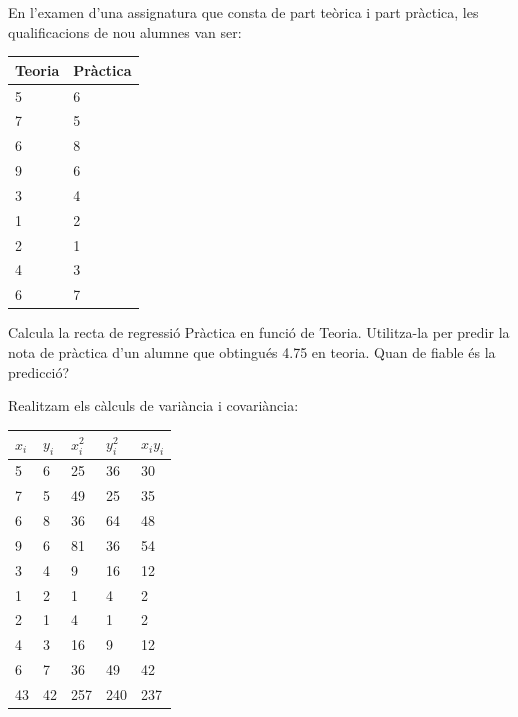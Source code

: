 \begin{resolt}[E]{
En l'examen d'una assignatura que consta de part teòrica i part pràctica, les qualificacions de nou alumnes van ser:
\vspace{0.25cm}

\begin{tabular}{|p{0.7in}|p{0.7in}|}
	 \hline
	\textbf{Teoria} & \textbf{Pràctica} \\ \hline
	5 & 6\\ \hline
	7 & 5 \\ \hline
	6 & 8 \\ \hline
	9 & 6\\ \hline
	3 & 4\\ \hline
	1 & 2\\ \hline
	2 & 1\\ \hline
	4 & 3\\ \hline
	6 & 7\\ \hline 
\end{tabular}
\vspace{0.25cm}

Calcula la recta de regressió Pràctica en funció de Teoria.
Utilitza-la per predir la nota de pràctica d'un alumne que obtingués 4.75 en teoria. Quan de fiable és la predicció?	

}

Realitzam els càlculs de variància i covariància:\vspace{0.25cm}

\begin{tabular}{|p{0.7in}|p{0.7in}|p{0.7in}|p{0.7in}|p{0.7in}|} \hline
	
	$x_i$ & $y_i$ & $x_i^2$ & $y_i^2$ & $x_i y_i$ \\ \hline
	5 & 6 & 25 & 36 & 30 \\ \hline
	7 & 5 & 49 & 25 & 35 \\ \hline
	6 & 8 & 36 & 64 & 48 \\ \hline
	9 & 6 & 81 & 36 & 54 \\ \hline
	3 & 4 & 9  & 16 & 12 \\ \hline
	1 & 2 & 1  & 4  & 2 \\ \hline
	2 & 1 & 4  & 1  & 2 \\ \hline
	4 & 3 & 16 & 9  &12\\ \hline
	6 & 7 & 36 & 49 & 42\\ \hline\hline
	\rowcolor{lightgray} 43 & 42	& 257 & 240 & 237 \\ \hline
\end{tabular}
\vspace{0.25cm}


\end{resolt}
